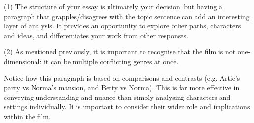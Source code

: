 \documentclass[a4paper]{article}
\begin{document}
(1) The structure of your essay is ultimately your decision, but having a paragraph that grapples/disagrees with the topic sentence can add an interesting layer of analysis. It provides an opportunity to explore other paths, characters and ideas, and differentiates your work from other responses.

(2) As mentioned previously, it is important to recognise that the film is not one-dimensional: it can be multiple conflicting genres at once.

Notice how this paragraph is based on comparisons and contrasts (e.g. Artie’s party vs Norma’s mansion, and Betty vs Norma). This is far more effective in conveying understanding and nuance than simply analysing characters and settings individually. It is important to consider their wider role and implications within the film.\\

 
\end{document}
